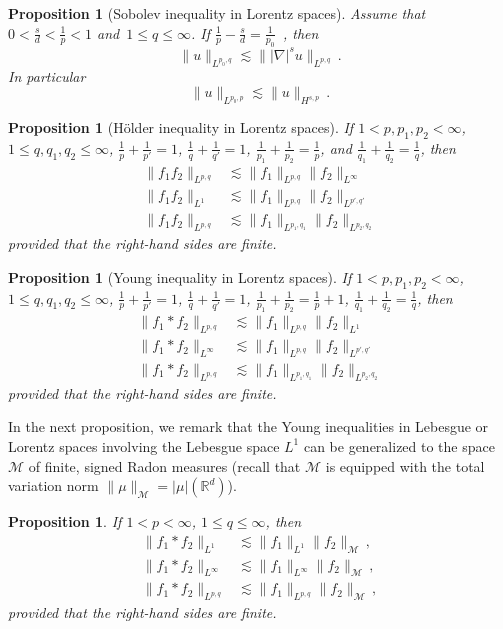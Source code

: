 \documentclass[12pt]{article}
\theoremstyle{plain}
\newtheorem{prop}[theo]{Proposition}
\newcommand{\meas}{\mathcal{M}}
\begin{document}
\begin{prop}[Sobolev inequality in Lorentz spaces]\label{pro:sobolev-lorentz}
Assume that $0<\frac{s}{d}<\frac{1}{p}<1$
and~$1\leq q\leq\infty$.
If $\frac{1}{p}-\frac{s}{d}=\frac{1}{p_0}$~,
then
\[
\|u\|_{L^{p_0,q}} \lesssim \| |\nabla|^s u \|_{L^{p,q}}\,.
\]
In particular
\[
\|u\|_{L^{p_0,p}} \lesssim \| u \|_{H^{s,p}}\,.
\]
\end{prop}
\begin{prop}[Hölder inequality in Lorentz spaces]\label{pro:holder-lorentz}
    If $1<p,p_1,p_2<\infty$, $1\leq q,q_1,q_2 \leq \infty$, $\frac{1}{p}+\frac{1}{p'}=1$, $\frac{1}{q}+\frac{1}{q'}=1$, $\frac{1}{p_1}+\frac{1}{p_2}=\frac{1}{p}$, and $\frac{1}{q_1}+\frac{1}{q_2}=\frac{1}{q}$, then
    \begin{align*}
        \|f_1 f_2\|_{L^{p,q}} & \lesssim \|f_1\|_{L^{p,q}} \|f_2\|_{L^{\infty}}\\
        \|f_1 f_2\|_{L^{1}} & \lesssim \|f_1\|_{L^{p,q}} \|f_2\|_{L^{p',q'}} \\
        \|f_1 f_2\|_{L^{p,q}} & \lesssim \|f_1\|_{L^{p_1,q_1}} \|f_2\|_{L^{p_2,q_2}}
    \end{align*}
    provided that the right-hand sides are finite.
\end{prop}
%
\begin{prop}[Young inequality in Lorentz spaces]\label{pro:young-lorentz}
    If $1<p,p_1,p_2<\infty$, $1\leq q,q_1,q_2 \leq \infty$, $\frac{1}{p}+\frac{1}{p'}=1$, $\frac{1}{q}+\frac{1}{q'}=1$, $\frac{1}{p_1}+\frac{1}{p_2}=\frac{1}{p}+1$, $\frac{1}{q_1}+\frac{1}{q_2}=\frac{1}{q}$, then
    \begin{align*}
    \|f_1* f_2\|_{L^{p,q}} &\lesssim \|f_1\|_{L^{p,q}} \|f_2\|_{L^{1}} \\
    \|f_1* f_2\|_{L^{\infty}} &\lesssim \|f_1\|_{L^{p,q}} \|f_2\|_{L^{p',q'}} \\
    \|f_1 *f_2\|_{L^{p,q}} &\lesssim \|f_1\|_{L^{p_1,q_1}} \|f_2\|_{L^{p_2,q_2}}
    \end{align*}
    provided that the right-hand sides are finite.
\end{prop}



In the next proposition, we remark that the Young inequalities in Lebesgue or Lorentz spaces involving the Lebesgue space $L^1$ can be generalized to the space $\meas$ of finite, signed Radon measures (recall that $\meas$ is equipped with the total variation norm $\|\mu\|_{\meas }=|\mu|(\mathbb{R}^d)$).
\begin{prop}\label{pro:young-lorentz-measure}
    If $1<p<\infty$, $1\leq q \leq \infty$, then
    \begin{align*}
    \|f_1* f_2\|_{L^{1}} 
    &\lesssim 
    \|f_1\|_{L^{1}} 
    \|f_2\|_{\meas}\,,\\
    \|f_1* f_2\|_{L^{\infty}} 
    &\lesssim 
    \|f_1\|_{L^{\infty}} 
    \|f_2\|_{\meas}\,,\\
    \|f_1* f_2\|_{L^{p,q}} 
    &\lesssim 
    \|f_1\|_{L^{p,q}} 
    \|f_2\|_{\meas}\,,
    \end{align*}
provided that the right-hand sides are finite.
\end{prop}
\end{document}
